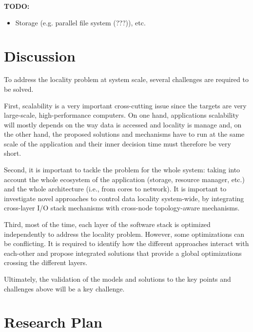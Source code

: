 {\bf TODO:}  
\begin{itemize}
\item Storage (e.g. parallel file system (???)), etc. 
\end{itemize}

\section{Discussion}
To address the locality problem at system scale, several challenges are required
to be solved. 

First, scalability is a very important cross-cutting issue since the targets are
very large-scale, high-performance computers. On one hand, applications
scalability will mostly depends on the way data is accessed and locality is
manage and, on the other hand, the proposed solutions and mechanisms have to run
at the same scale of the application and their inner decision time must
therefore be very short.

Second, it is important to tackle the problem for the whole system: taking into account
the whole ecosystem of the application (storage, resource manager, etc.) and the
whole architecture (i.e., from cores to network). It is important to investigate
novel approaches to control data locality system-wide, by integrating
cross-layer I/O stack mechanisms  with cross-node topology-aware mechanisms. 

Third, most of the time, each layer of the software stack is optimized
independently to address the locality problem. However, some optimizations can
be conflicting. It is required to identify how the different approaches interact
with each-other and propose integrated solutions that provide a global
optimizations crossing the different layers.

Ultimately, the validation of the models and solutions to the key points and challenges above 
will be a key challenge.

\section{Research Plan}

